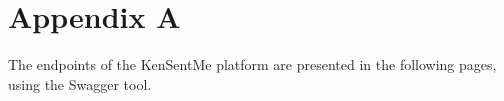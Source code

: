 

\chapter{Appendix A}
\label{ch:appendixA}

The endpoints of the KenSentMe platform are presented in the following pages, using the Swagger tool.


